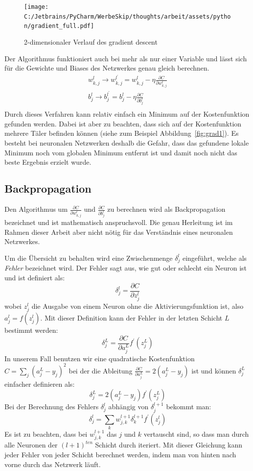 \documentclass[12pt,a4paper]{report}
\begin{document}
\begin{figure}[h]%
    \centering
    \texttt{[image: C:/Jetbrains/PyCharm/WerbeSkip/thoughts/arbeit/assets/python/gradient\_full.pdf]} %
    \caption{2-dimensionaler Verlauf des gradient descent}%
    \label{fig:grad2}%
\end{figure}

Der Algorithmus funktioniert auch bei mehr als nur einer Variable und lässt sich für die Gewichte und Biases des Netzwerkes genau gleich berechnen.
\begin{gather*}
    w^l_{k,j} \rightarrow w^{l^\prime}_{k,j} = w^l_{k,j} - \eta\frac{\partial C}{\partial w^l_{k,j}}\\
    b^l_j \rightarrow b^{l^\prime}_j = b^l_j - \eta\frac{\partial C}{\partial b^l_j}\\
\end{gather*}
Durch dieses Verfahren kann relativ einfach ein Minimum auf der Kostenfunktion gefunden werden.
Dabei ist aber zu beachten, dass sich auf der Kostenfunktion mehrere Täler befinden können (siehe zum Beispiel Abbildung~\ref{fig:grad1}).
Es besteht bei neuronalen Netzwerken deshalb die Gefahr, dass das gefundene lokale Minimum noch vom globalen Minimum entfernt ist und
damit noch nicht das beste Ergebnis erzielt wurde.

\subsection{Backpropagation}
Den Algorithmus um $\frac{\partial C}{\partial w^l_{k,j}}$ und $\frac{\partial C}{\partial b^l_j}$ zu berechnen wird als
Backpropagation bezeichnet und ist mathematisch anspruchsvoll.
Die genau Herleitung ist im Rahmen dieser Arbeit aber nicht nötig für das Verständnis eines neuronalen Netzwerkes.

Um die Übersicht zu behalten wird eine Zwischenmenge $\delta^l_j$ eingeführt, welche als \textit{Fehler} bezeichnet wird.
Der Fehler sagt aus, wie gut oder schlecht ein Neuron ist und ist definiert als:
\[\delta^l_j = \frac{\partial C}{\partial z^l_j}\]
wobei $z^l_j$ die Ausgabe von einem Neuron ohne die Aktivierungsfunktion ist, also $a^l_j = f(z^l_j)$.
Mit dieser Definition kann der Fehler in der letzten Schicht $L$ bestimmt werden:
\[\delta^L_j = \frac{\partial C}{\partial a^L_j}f^\prime(z^L_j)\]
In unserem Fall benutzen wir eine quadratische Kostenfunktion $C = \sum_{j}(a^L_j - y_j)^2$ bei
der die Ableitung $\frac{\partial C}{\partial a^L_j} = 2(a^L_j - y_j)$ ist und können $\delta^L_j$ einfacher definieren als:
\[\delta^L_j = 2(a^L_j - y_j)f^\prime(z^L_j)\]
Bei der Berechnung des Fehlers $\delta^l_j$ abhängig von $\delta^{l+1}_j$ bekommt man:
\[\delta^l_j = \sum_k w^{l+1}_{j,k}\delta^{l+1}_k f^\prime(z^l_j)\]
Es ist zu beachten, dass bei $w^{l+1}_{j,k}$ das $j$ und $k$ vertauscht sind, so dass man durch alle Neuronen der $(l+1)^{ten}$ Schicht durch iteriert.
Mit dieser Gleichung kann jeder Fehler von jeder Schicht berechnet werden, indem man von hinten nach vorne durch das Netzwerk läuft.
\end{document}
